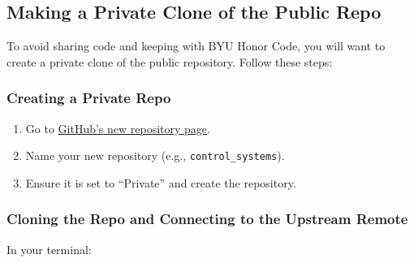 \documentclass{article}
\begin{document}
\subsection{Making a Private Clone of the Public Repo}
To avoid sharing code and keeping with BYU Honor Code, you will want to create a private clone of the public repository.
\newline
\newline
Follow these steps:

\subsubsection{Creating a Private Repo}
\begin{enumerate}
    \item Go to \href{https://github.com/new}{GitHub's new repository page}.
    \item Name your new repository (e.g., \texttt{control\_systems}).
    \item Ensure it is set to ``Private'' and create the repository.
\end{enumerate}

\subsubsection{Cloning the Repo and Connecting to the Upstream Remote}
In your terminal:
\end{document}
